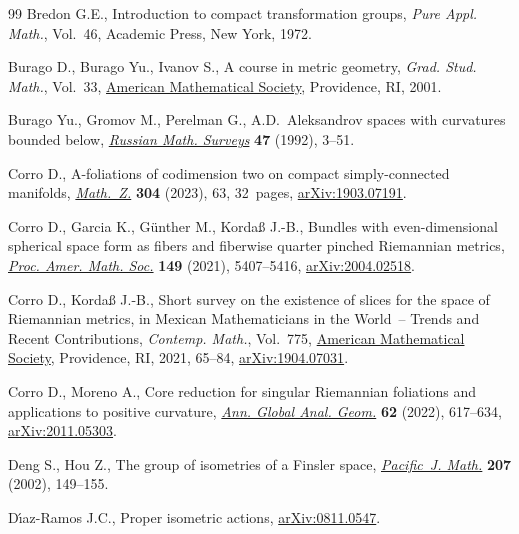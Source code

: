 \documentclass[pdftex]{sigma}
\numberwithin{equation}{section}
\theoremstyle{definition}
\begin{document}
\begin{thebibliography}{99}
Bredon G.E., Introduction to compact transformation groups, \textit{Pure Appl.
 Math.}, Vol.~46, Academic Press, New York, 1972.

Burago D., Burago Yu., Ivanov S., A course in metric geometry, \textit{Grad.
 Stud. Math.}, Vol.~33, \href{https://doi.org/10.1090/gsm/033}{American
 Mathematical Society}, Providence, RI, 2001.

Burago Yu., Gromov M., Perelman G., A.{D}.~{A}leksandrov spaces with curvatures
 bounded below,
 \href{https://doi.org/10.1070/RM1992v047n02ABEH000877}{\textit{Russian Math.
 Surveys}} \textbf{47} (1992), 3--51.

Corro D., A-foliations of codimension two on compact simply-connected
 manifolds,
 \href{https://doi.org/10.1007/s00209-023-03317-3}{\textit{Math.~Z.}}
 \textbf{304} (2023), 63, 32~pages,
 \href{http://arxiv.org/abs/1903.07191}{arXiv:1903.07191}.

Corro D., Garcia K., G\"unther M., Korda{\ss} J.-B., Bundles with even-dimensional
 spherical space form as fibers and fiberwise quarter pinched {R}iemannian
 metrics, \href{https://doi.org/10.1090/proc/15649}{\textit{Proc. Amer. Math.
 Soc.}} \textbf{149} (2021), 5407--5416,
 \href{http://arxiv.org/abs/2004.02518}{arXiv:2004.02518}.

Corro D., Korda{\ss} J.-B., Short survey on the existence of slices for the
 space of {R}iemannian metrics, in Mexican {M}athematicians in the {W}orld~--
 {T}rends and {R}ecent {C}ontributions, \textit{Contemp. Math.}, Vol.~775,
 \href{https://doi.org/10.1090/conm/775/15589}{American Mathematical Society}, Providence, RI, 2021, 65--84, \href{http://arxiv.org/abs/1904.07031}{arXiv:1904.07031}.

Corro D., Moreno A., Core reduction for singular {R}iemannian foliations and
 applications to positive curvature,
 \href{https://doi.org/10.1007/s10455-022-09856-y}{\textit{Ann. Global Anal.
 Geom.}} \textbf{62} (2022), 617--634,
 \href{http://arxiv.org/abs/2011.05303}{arXiv:2011.05303}.

Deng S., Hou Z., The group of isometries of a {F}insler space,
 \href{https://doi.org/10.2140/pjm.2002.207.149}{\textit{Pacific~J. Math.}}
 \textbf{207} (2002), 149--155.

D\'{\i}az-Ramos J.C., Proper isometric actions,
 \href{http://arxiv.org/abs/0811.0547}{arXiv:0811.0547}.


\end{thebibliography}
\end{document}

